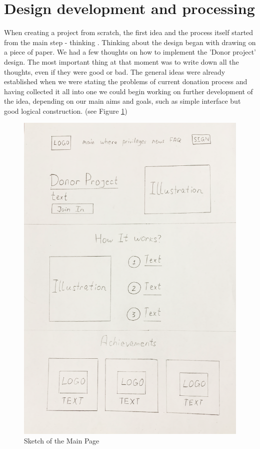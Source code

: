 \section{Design development and processing}
\par
When creating a project from scratch, the first idea and the process itself started from the main step - thinking \cite{eyal}. Thinking about the design began with drawing on a piece of paper. We had a few thoughts on how to implement the 'Donor project' design. The most important thing at that moment was to write down all the thoughts, even if they were good or bad. The general ideas were already established when we were stating the problems of current donation process and having collected it all into one we could begin working on further development of the idea, depending on our main aims and goals, such as simple interface but good logical construction. (see Figure \ref{fig:main})
\begin{figure}[h]
    \centering
    \includegraphics[scale=0.18]{figures/1.png}
    \caption{Sketch of the Main Page}
    \label{fig:main}
\end{figure}
